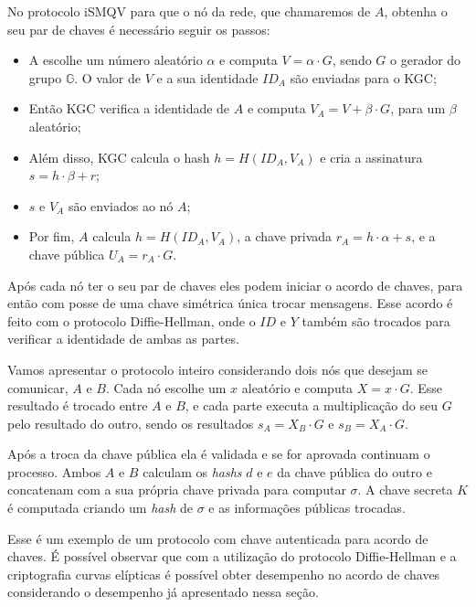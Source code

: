 No protocolo iSMQV para que o nó da rede, que chamaremos de $A$, obtenha o seu par de chaves é necessário seguir os passos:
\begin{itemize}
    \item A escolhe um número aleatório $\alpha$ e computa $V = \alpha \cdot G$, sendo $G$ o gerador do grupo $\mathbb{G}$. O valor de $V$ e a sua identidade $ID_A$ são enviadas para o KGC;
    \item Então KGC verifica a identidade de $A$ e computa $V_A = V + \beta \cdot G$, para um $\beta$ aleatório;
    \item Além disso, KGC calcula o hash $h = H(ID_A, V_A)$ e cria a assinatura $s = h \cdot \beta + r$;
    \item $s$ e $V_A$ são enviados ao nó $A$;
    \item Por fim, $A$ calcula $h = H(ID_A, V_A)$, a chave privada $r_A = h \cdot \alpha + s$, e a chave pública $U_A = r_A \cdot G$.
\end{itemize}

Após cada nó ter o seu par de chaves eles podem iniciar o acordo de chaves, para então com posse de uma chave simétrica única trocar mensagens. Esse acordo é feito com o protocolo Diffie-Hellman, onde o $ID$ e $Y$ também são trocados para verificar a identidade de ambas as partes. 

Vamos apresentar o protocolo inteiro considerando dois nós que desejam se comunicar, $A$ e $B$. Cada nó escolhe um $x$ aleatório e computa $X = x \cdot G$. Esse resultado é trocado entre $A$ e $B$, e cada parte executa a multiplicação do seu $G$ pelo resultado do outro, sendo os resultados $s_A = X_B \cdot G$ e $s_B = X_A \cdot G$.

Após a troca da chave pública ela é validada e se for aprovada continuam o processo. Ambos $A$ e $B$ calculam os \textit{hashs} $d$ e $e$ da chave pública do outro e concatenam com a sua própria chave privada para computar $\sigma$. A chave secreta $K$ é computada criando um \textit{hash} de $\sigma$ e as informações públicas trocadas.

Esse é um exemplo de um protocolo com chave autenticada para acordo de chaves. É possível observar que com a utilização do protocolo Diffie-Hellman e a criptografia curvas elípticas é possível obter desempenho no acordo de chaves considerando o desempenho já apresentado nessa seção.